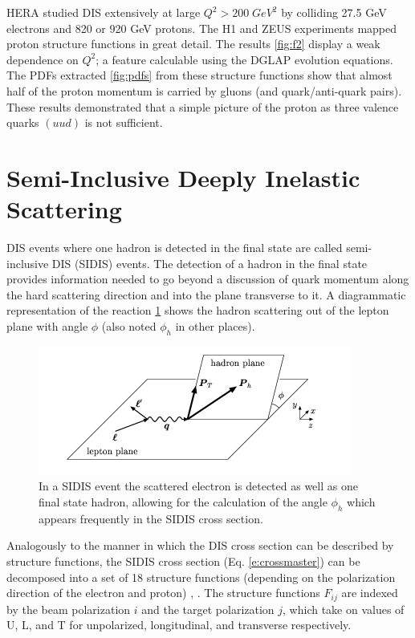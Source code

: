 HERA studied DIS extensively at large $Q^2 > 200 \; GeV^2$ by colliding 27.5 GeV electrons and 820 or 920 GeV protons.  The H1 and ZEUS experiments mapped proton structure functions in great detail.  The results \ref{fig:f2} display a weak dependence on $Q^2$; a feature calculable using the DGLAP evolution equations.  The PDFs extracted \ref{fig:pdfs} from these structure functions show that almost half of the proton momentum is carried by gluons (and quark/anti-quark pairs).  These results demonstrated that a simple picture of the proton as three valence quarks $(uud)$ is not sufficient.    

\section{Semi-Inclusive Deeply Inelastic Scattering}
DIS events where one hadron is detected in the final state are called semi-inclusive DIS (SIDIS) events.  The detection of a hadron in the final state provides information needed to go beyond a discussion of quark momentum along the hard scattering direction and into the plane transverse to it.  A diagrammatic representation of the reaction \ref{fig:sidis} shows the hadron scattering out of the lepton plane with angle $\phi$ (also noted $\phi_h$ in other places).

\begin{figure}
	\centering
	\label{fig:sidis}
	\includegraphics[width = \textwidth]{image/diagrams/phi-hadron.png}	
	\caption[Diagrammatic representation of SIDIS with hadronic $\phi_h$ angle.]{In a SIDIS event the scattered electron is detected as well as one final state hadron, allowing for the calculation of the angle $\phi_h$ which appears frequently in the SIDIS cross section.}
\end{figure}

Analogously to the manner in which the DIS cross section can be described by structure functions, the SIDIS cross section (Eq. \ref{e:crossmaster}) can be decomposed into a set of 18 structure functions (depending on the polarization direction of the electron and proton) \cite{tmds-mulders:1995}, \cite{tmds-bacchetta:2006}.  The structure functions $F_{ij}$ are indexed by the beam polarization $i$ and the target polarization $j$, which take on values of U, L, and T for unpolarized, longitudinal, and transverse respectively.

